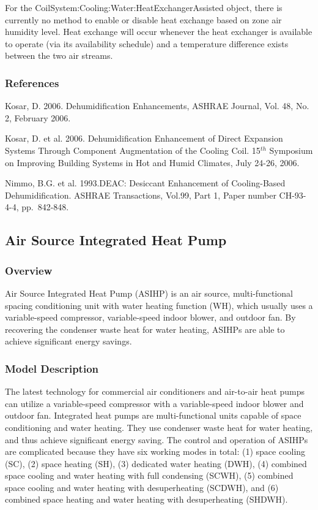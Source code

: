 For the CoilSystem:Cooling:Water:HeatExchangerAssisted object, there is currently no method to enable or disable heat exchange based on zone air humidity level. Heat exchange will occur whenever the heat exchanger is available to operate (via its availability schedule) and a temperature difference exists between the two air streams.

\subsubsection{References}\label{references-8}

Kosar, D. 2006. Dehumidification Enhancements, ASHRAE Journal, Vol. 48, No. 2, February 2006.

Kosar, D. et al. 2006. Dehumidification Enhancement of Direct Expansion Systems Through Component Augmentation of the Cooling Coil. 15\(^{th}\) Symposium on Improving Building Systems in Hot and Humid Climates, July 24-26, 2006.

Nimmo, B.G. et al. 1993.DEAC: Desiccant Enhancement of Cooling-Based Dehumidification. ASHRAE Transactions, Vol.99, Part 1, Paper number CH-93-4-4, pp.~842-848.


\subsection{Air Source Integrated Heat Pump}\label{Air-Source-Integrated-Heat-Pump-Section}

\subsubsection{Overview}\label{overview-ASIHP}

Air Source Integrated Heat Pump (ASIHP) is an air source, multi-functional spacing conditioning unit with water heating function (WH), which usually uses a variable-speed compressor, variable-speed indoor blower, and outdoor fan. By recovering the condenser waste heat for water heating, ASIHPs are able to achieve significant energy savings.

\subsubsection{Model Description}\label{model-description-ASIHP}

The latest technology for commercial air conditioners and air-to-air heat pumps can utilize a variable-speed compressor with a variable-speed indoor blower and outdoor fan. Integrated heat pumps are multi-functional units capable of space conditioning and water heating. They use condenser waste heat for water heating, and thus achieve significant energy saving. The control and operation of ASIHPs are complicated because they have six working modes in total:  (1) space cooling (SC), (2) space heating (SH), (3) dedicated water heating (DWH), (4) combined space cooling and water heating with full condensing (SCWH), (5) combined space cooling and water heating with desuperheating (SCDWH), and (6) combined space heating and water heating with desuperheating (SHDWH).

